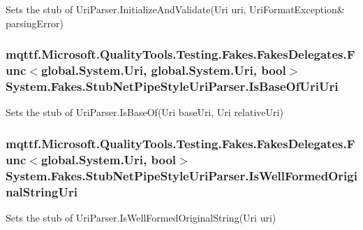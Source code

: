Sets the stub of Uri\-Parser.\-Initialize\-And\-Validate(Uri uri, Uri\-Format\-Exception\& parsing\-Error)

\hypertarget{class_system_1_1_fakes_1_1_stub_net_pipe_style_uri_parser_a77fdc506026bb23382e4058959980e62}{
\subsubsection[{Is\-Base\-Of\-Uri\-Uri}]{\setlength{\rightskip}{0pt plus 5cm}mqttf.\-Microsoft.\-Quality\-Tools.\-Testing.\-Fakes.\-Fakes\-Delegates.\-Func$<$global.\-System.\-Uri, global.\-System.\-Uri, bool$>$ System.\-Fakes.\-Stub\-Net\-Pipe\-Style\-Uri\-Parser.\-Is\-Base\-Of\-Uri\-Uri}}\label{class_system_1_1_fakes_1_1_stub_net_pipe_style_uri_parser_a77fdc506026bb23382e4058959980e62}


Sets the stub of Uri\-Parser.\-Is\-Base\-Of(\-Uri base\-Uri, Uri relative\-Uri)

\hypertarget{class_system_1_1_fakes_1_1_stub_net_pipe_style_uri_parser_aa201f19d2d68e796a311859636e752a1}{
\subsubsection[{Is\-Well\-Formed\-Original\-String\-Uri}]{\setlength{\rightskip}{0pt plus 5cm}mqttf.\-Microsoft.\-Quality\-Tools.\-Testing.\-Fakes.\-Fakes\-Delegates.\-Func$<$global.\-System.\-Uri, bool$>$ System.\-Fakes.\-Stub\-Net\-Pipe\-Style\-Uri\-Parser.\-Is\-Well\-Formed\-Original\-String\-Uri}}\label{class_system_1_1_fakes_1_1_stub_net_pipe_style_uri_parser_aa201f19d2d68e796a311859636e752a1}


Sets the stub of Uri\-Parser.\-Is\-Well\-Formed\-Original\-String(\-Uri uri)

